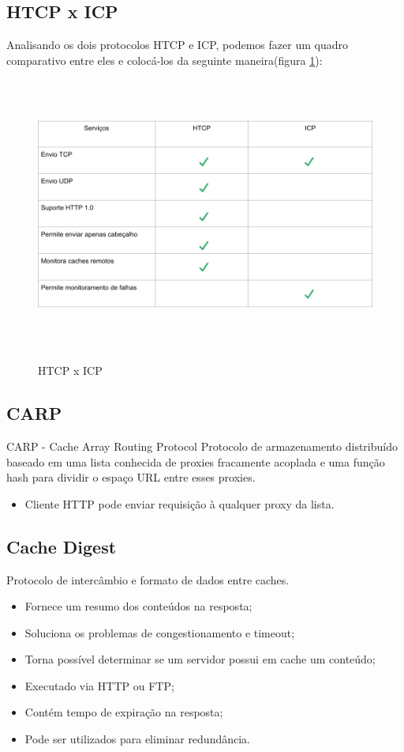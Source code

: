 \subsection{HTCP x ICP}
Analisando os dois protocolos HTCP e ICP, podemos fazer um quadro comparativo entre eles e coloc\'a-los da seguinte maneira(figura \ref{figura:htcp_x_icp}):

\begin{figure}[H]
\caption{HTCP x ICP}
\includegraphics[height=9cm]{Figuras/htcp_x_icp.png} 
\label{figura:htcp_x_icp}
\end{figure}

\subsection{CARP}
\label{section:CARP}
CARP -  Cache Array Routing Protocol
 Protocolo de armazenamento distribu\'ido baseado em uma lista conhecida de proxies fracamente acoplada e uma fun\c{c}\~ao hash para dividir o espa\c{c}o URL entre esses proxies.
\begin{itemize}
\item Cliente HTTP pode enviar requisi\c{c}\~ao \`a qualquer proxy da lista.
\end{itemize}

\subsection{Cache Digest}
\label{section:Cache Digest}
Protocolo de interc\^ambio e formato de dados entre caches.
\begin{itemize}
\item Fornece um resumo dos conte\'udos na resposta;
\item Soluciona os problemas de congestionamento e timeout;
\item Torna poss\'ivel determinar se um servidor possui em cache um conte\'udo;
\item Executado via HTTP ou FTP;
\item Cont\'em tempo de expira\c{c}\~ao na resposta;
\item Pode ser utilizados para eliminar redund\^ancia.
\end{itemize}
